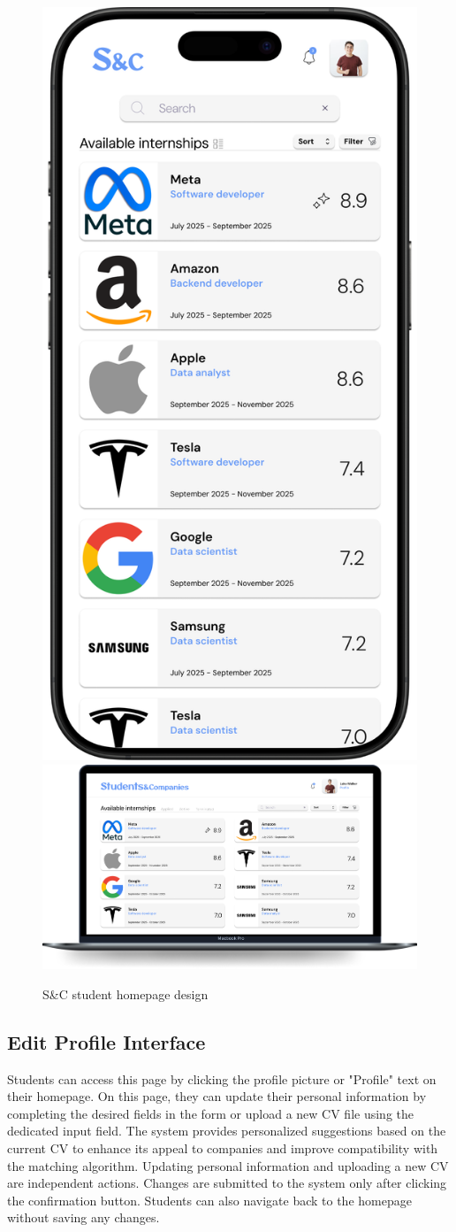 \begin{figure}[H]
    \centering
    \includegraphics[width=0.2\linewidth]{Images/Mock-up/mobile homepage student.png}
    \includegraphics[width=0.75\linewidth]{Images/Mock-up/homepage student.png}
    \caption{S\&C student homepage design}
    \label{fig:homepage-design}
\end{figure}
    

\subsection{Edit Profile Interface}

Students can access this page by clicking the profile picture or "Profile" text on their homepage. On this page, they can update their personal information by completing the desired fields in the form or upload a new CV file using the dedicated input field. The system provides personalized suggestions based on the current CV to enhance its appeal to companies and improve compatibility with the matching algorithm. Updating personal information and uploading a new CV are independent actions. Changes are submitted to the system only after clicking the confirmation button. Students can also navigate back to the homepage without saving any changes. \\

